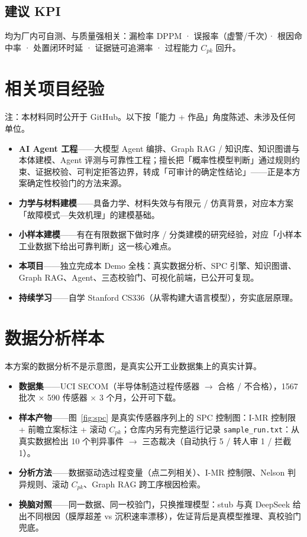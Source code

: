 \documentclass[a4paper, 11pt, fontset=fandol]{ctexart}
\begin{document}
\subsection*{建议 KPI}

均为厂内可自测、与质量强相关：漏检率 DPPM · 误报率（虚警/千次）· 根因命中率 · 处置闭环时延 · 证据链可追溯率 · 过程能力 $C_{pk}$ 回升。

\section{相关项目经验}

\noindent
{\color{soft}\small 注：本材料同时公开于 GitHub。以下按「能力 + 作品」角度陈述、未涉及任何单位。}

\begin{itemize}
  \item \textbf{AI Agent 工程}——大模型 Agent 编排、Graph RAG / 知识库、知识图谱与本体建模、Agent 评测与可靠性工程；擅长把「概率性模型判断」通过规则约束、证据校验、可判定拒答边界，转成「可审计的确定性结论」——正是本方案确定性校验门的方法来源。
  \item \textbf{力学与材料建模}——具备力学、材料失效与有限元 / 仿真背景，对应本方案「故障模式—失效机理」的建模基础。
  \item \textbf{小样本建模}——有在有限数据下做时序 / 分类建模的研究经验，对应「小样本工业数据下给出可靠判断」这一核心难点。
  \item \textbf{本项目}——独立完成本 Demo 全栈：真实数据分析、SPC 引擎、知识图谱、Graph RAG、Agent、三态校验门、可视化前端，已公开可复现。
  \item \textbf{持续学习}——自学 Stanford CS336（从零构建大语言模型），夯实底层原理。
\end{itemize}

\section{数据分析样本}

本方案的数据分析不是示意图，是真实公开工业数据集上的真实计算。

\begin{itemize}
  \item \textbf{数据集}——UCI SECOM（半导体制造过程传感器 $\to$ 合格 / 不合格），1567 批次 × 590 传感器 × 3 个月，公开可下载。
  \item \textbf{样本产物}——图~\ref{fig:spc} 是真实传感器序列上的 SPC 控制图：I-MR 控制限 + 前瞻立案标注 + 滚动 $C_{pk}$；仓库内另有完整运行记录 \texttt{sample\_run.txt}：从真实数据检出 10 个判异事件 $\to$ 三态裁决（自动执行 5 / 转人审 1 / 拦截 1）。
  \item \textbf{分析方法}——数据驱动选过程变量（点二列相关）、I-MR 控制限、Nelson 判异规则、滚动 $C_{pk}$、Graph RAG 跨工序根因检索。
  \item \textbf{换脑对照}——同一数据、同一校验门，只换推理模型：stub 与真 DeepSeek 给出不同根因（膜厚超差 vs 沉积速率漂移），佐证背后是真模型推理、真校验门兜底。
\end{itemize}
\end{document}
